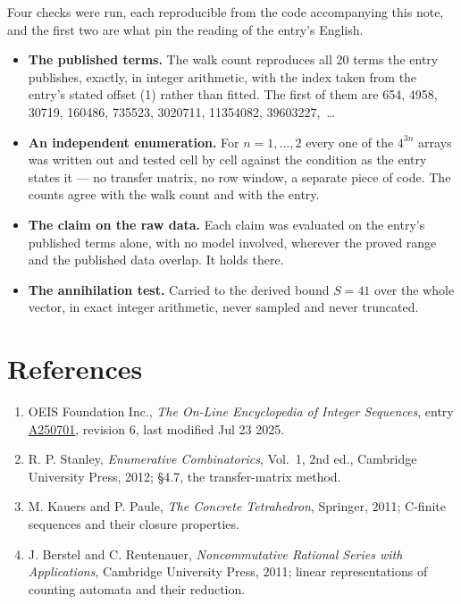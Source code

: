 \documentclass[11pt]{article}
\theoremstyle{definition}
\begin{document}
Four checks were run, each reproducible from the code accompanying this note, and the first two are what pin the reading of the entry's English.

\begin{itemize}

\item {\bfseries The published terms.} The walk count reproduces all 20 terms the entry publishes, exactly, in integer arithmetic, with the index taken from the entry's stated offset (1) rather than fitted. The first of them are 654, 4958, 30719, 160486, 735523, 3020711, 11354082, 39603227,~\dots

\item {\bfseries An independent enumeration.} For $n = 1,\dots,2$ every one of the $4^{3n}$ arrays was written out and tested cell by cell against the condition as the entry states it --- no transfer matrix, no row window, a separate piece of code. The counts agree with the walk count and with the entry.

\item {\bfseries The claim on the raw data.} Each claim was evaluated on the entry's published terms alone, with no model involved, wherever the proved range and the published data overlap. It holds there.

\item {\bfseries The annihilation test.} Carried to the derived bound $S = 41$ over the whole vector, in exact integer arithmetic, never sampled and never truncated.

\end{itemize}

\section{References}

\begin{enumerate}

\item OEIS Foundation Inc., \emph{The On-Line Encyclopedia of Integer Sequences}, entry \href{https://oeis.org/A250701}{A250701}, revision 6, last modified Jul 23 2025.

\item R. P. Stanley, \emph{Enumerative Combinatorics}, Vol.~1, 2nd ed., Cambridge University Press, 2012; \S4.7, the transfer-matrix method.

\item M. Kauers and P. Paule, \emph{The Concrete Tetrahedron}, Springer, 2011; C-finite sequences and their closure properties.

\item J. Berstel and C. Reutenauer, \emph{Noncommutative Rational Series with Applications}, Cambridge University Press, 2011; linear representations of counting automata and their reduction.

\end{enumerate}
\end{document}

